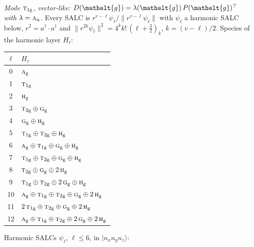 \documentclass[11pt]{article}
\newcommand{\eltfont}[1]{{\let\sigma\eltsigma\mathelt{#1}}}
\newcommand{\irr}[1]{\text{\normalfont\scshape #1}}
\newcommand{\elt}[1]{\eltfont{#1}}
\newcommand{\ptag}[1]{\mathrm{#1}}
\newcommand{\occ}[1]{\lvert #1\rangle}
\newcommand{\gel}{\elt{g}}             %
\newcommand{\gmat}{P(\gel)^{\top}}     %
\begin{document}
\emph{Mode $\irr{t}_{1\ptag{g}}$, vector-like: $D(\gel)=\lambda(\gel)\,\gmat$ with $\lambda=\irr{a}_{\ptag{u}}$.} Every SALC is $r^{v-\ell}\psi_\ell/\lVert r^{v-\ell}\psi_\ell\rVert$ with $\psi_\ell$ a harmonic SALC below, $r^2=a^\dagger\!\cdot a^\dagger$ and $\lVert r^{2k}\psi_\ell\rVert^2=4^kk!\,(\ell+\tfrac32)_k$, $k=(v-\ell)/2$. Species of the harmonic layer $H_\ell$:
\begin{longtable}{c l}\hline $\ell$ & $H_\ell$\\ \hline\endhead
0 & $\irr{a}_{\ptag{g}}$\\
1 & $\irr{t}_{1\ptag{g}}$\\
2 & $\irr{h}_{\ptag{g}}$\\
3 & $\irr{t}_{2\ptag{g}}\oplus \irr{g}_{\ptag{g}}$\\
4 & $\irr{g}_{\ptag{g}}\oplus \irr{h}_{\ptag{g}}$\\
5 & $\irr{t}_{1\ptag{g}}\oplus \irr{t}_{2\ptag{g}}\oplus \irr{h}_{\ptag{g}}$\\
6 & $\irr{a}_{\ptag{g}}\oplus \irr{t}_{1\ptag{g}}\oplus \irr{g}_{\ptag{g}}\oplus \irr{h}_{\ptag{g}}$\\
7 & $\irr{t}_{1\ptag{g}}\oplus \irr{t}_{2\ptag{g}}\oplus \irr{g}_{\ptag{g}}\oplus \irr{h}_{\ptag{g}}$\\
8 & $\irr{t}_{2\ptag{g}}\oplus \irr{g}_{\ptag{g}}\oplus 2\,\irr{h}_{\ptag{g}}$\\
9 & $\irr{t}_{1\ptag{g}}\oplus \irr{t}_{2\ptag{g}}\oplus 2\,\irr{g}_{\ptag{g}}\oplus \irr{h}_{\ptag{g}}$\\
10 & $\irr{a}_{\ptag{g}}\oplus \irr{t}_{1\ptag{g}}\oplus \irr{t}_{2\ptag{g}}\oplus \irr{g}_{\ptag{g}}\oplus 2\,\irr{h}_{\ptag{g}}$\\
11 & $2\,\irr{t}_{1\ptag{g}}\oplus \irr{t}_{2\ptag{g}}\oplus \irr{g}_{\ptag{g}}\oplus 2\,\irr{h}_{\ptag{g}}$\\
12 & $\irr{a}_{\ptag{g}}\oplus \irr{t}_{1\ptag{g}}\oplus \irr{t}_{2\ptag{g}}\oplus 2\,\irr{g}_{\ptag{g}}\oplus 2\,\irr{h}_{\ptag{g}}$\\
\hline\end{longtable}
Harmonic SALCs $\psi_\ell$, $\ell\le6$, in $\occ{n_xn_yn_z}$:
\end{document}
